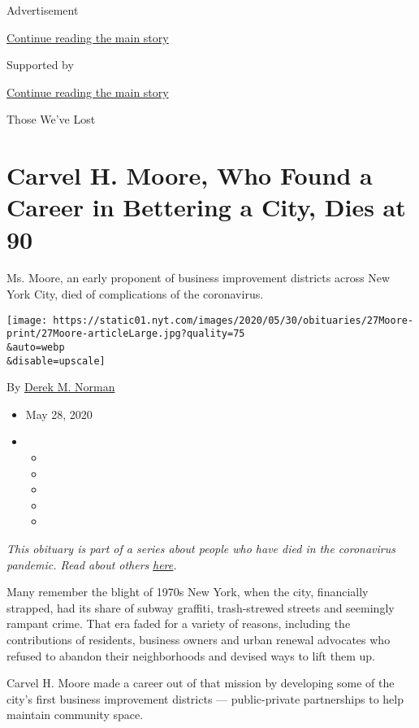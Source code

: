 Advertisement

\protect\hyperlink{after-top}{Continue reading the main story}

Supported by

\protect\hyperlink{after-sponsor}{Continue reading the main story}

Those We've Lost

\hypertarget{carvel-h-moore-who-found-a-career-in-bettering-a-city-dies-at-90}{%
\section{Carvel H. Moore, Who Found a Career in Bettering a City, Dies
at
90}\label{carvel-h-moore-who-found-a-career-in-bettering-a-city-dies-at-90}}

Ms. Moore, an early proponent of business improvement districts across
New York City, died of complications of the coronavirus.

\texttt{[image: https://static01.nyt.com/images/2020/05/30/obituaries/27Moore-print/27Moore-articleLarge.jpg?quality=75\\\&auto=webp\\\&disable=upscale]}

By \href{https://www.nytimes.com/by/derek-m-norman}{Derek M. Norman}

\begin{itemize}
\item
  May 28, 2020
\item
  \begin{itemize}
  \item
  \item
  \item
  \item
  \item
  \end{itemize}
\end{itemize}

\emph{This obituary is part of a series about people who have died in
the coronavirus pandemic. Read about others}
\href{https://www.nytimes.com/interactive/2020/obituaries/people-died-coronavirus-obituaries.html}{\emph{here}}\emph{.}

Many remember the blight of 1970s New York, when the city, financially
strapped, had its share of subway graffiti, trash-strewed streets and
seemingly rampant crime. That era faded for a variety of reasons,
including the contributions of residents, business owners and urban
renewal advocates who refused to abandon their neighborhoods and devised
ways to lift them up.

Carvel H. Moore made a career out of that mission by developing some of
the city's first business improvement districts --- public-private
partnerships to help maintain community space.

